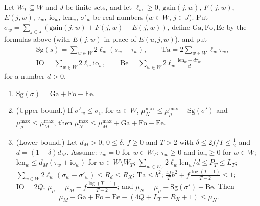 \begin{lemma}\label{pf:top-shape:wse}
Let $W_T\subseteq W$ and $J$ be finite sets, and let $\ell_w\ge0$, $\mathrm{gain}(j,w)$, $F(j,w)$, $E(j,w)$, $\tau_w$,
$\mathrm{io}_w$, $\mathrm{len}_w$, $\sigma'_w$ be real numbers ($w\in W$, $j\in J$). Put
$\sigma_w=\sum_{j\in J}(\mathrm{gain}(j,w)+F(j,w)-E(j,w))$, define $\mathrm{Ga},\mathrm{Fo},\mathrm{Ee}$ by the formulas above
(with $E(j,w)$ in place of $E(u,j,w)$), and put
\begin{gather*}
\mathrm{Sg}(s)=\sum_{w\in W}2\ell_w(s_w-\tau_w),\qquad\mathrm{Ta}=2\sum_{w\in W}\ell_w\tau_w,\\
\mathrm{IO}=\sum_{w\in W}2\ell_w\mathrm{io}_w,\qquad\mathrm{Be}=\sum_{w\in W}2\ell_w\frac{\mathrm{len}_w-d\tau_w}{d}
\end{gather*}
for a number $d>0$.
\begin{enumerate}[label=(\alph*)]
\item $\mathrm{Sg}(\sigma)=\mathrm{Ga}+\mathrm{Fo}-\mathrm{Ee}$.
\item (Upper bound.) If $\sigma'_w\le\sigma_w$ for $w\in W$, $\mu^{\max}_N\le\mu^{\max}_\mu+\mathrm{Sg}(\sigma')$ and
$\mu^{\max}_\mu\le\mu^{\max}_M$, then $\mu^{\max}_N\le\mu^{\max}_M+\mathrm{Ga}+\mathrm{Fo}-\mathrm{Ee}$.
\item (Lower bound.) Let $d_M>0$, $0\le\delta$, $f\ge0$ and $T>2$ with $\delta\le2f/T\le\frac12$ and $d=(1-\delta)d_M$.
Assume: $\tau_w=0$ for $w\in W_T$; $\tau_w\ge0$ and $\mathrm{io}_w\ge0$ for $w\in W$; $\mathrm{len}_w\le
d_M(\tau_w+\mathrm{io}_w)$ for $w\in W\setminus W_T$; $\sum_{w\in W_T}2\ell_w\mathrm{len}_w/d\le P_T\le L_T$;
$\sum_{w\in W}2\ell_w(\sigma_w-\sigma'_w)\le R_d\le R_X$; $\mathrm{Ta}\le b^2$;
$\frac{4f}Tb^2+f\frac{\log(T-1)}{T-2}\le1$; $\mathrm{IO}=2Q$; $\mu_\mu=\mu_M-f\frac{\log(T-1)}{T-2}$; and
$\mu_N=\mu_\mu+\mathrm{Sg}(\sigma')-\mathrm{Be}$. Then
\[
\mu_M+\mathrm{Ga}+\mathrm{Fo}-\mathrm{Ee}-(4Q+L_T+R_X+1)\le\mu_N .
\]
\end{enumerate}
\end{lemma}

